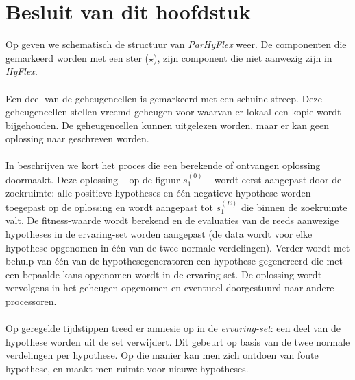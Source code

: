 \section{Besluit van dit hoofdstuk}

Op  geven we schematisch de structuur van \emph{ParHyFlex} weer.	De componenten die gemarkeerd worden met een ster ($\star$), zijn component die niet aanwezig zijn in \emph{HyFlex}.

\paragraph{}
Een deel van de geheugencellen is gemarkeerd met een schuine streep. Deze geheugencellen stellen vreemd geheugen voor waarvan er lokaal een kopie wordt bijgehouden. De geheugencellen kunnen uitgelezen worden, maar er kan geen oplossing naar geschreven worden.

\paragraph{}
In  beschrijven we kort het proces die een berekende of ontvangen oplossing doormaakt. Deze oplossing -- op de figuur $s_1^{(0)}$ -- wordt eerst aangepast door de zoekruimte: alle positieve hypotheses en \'e\'en negatieve hypothese worden toegepast op de oplossing en wordt aangepast tot $s_1^{(E)}$ die binnen de zoekruimte valt. De fitness-waarde wordt berekend en de evaluaties van de reeds aanwezige hypotheses in de ervaring-set worden aangepast (de data wordt voor elke hypothese opgenomen in \'e\'en van de twee normale verdelingen). Verder wordt met behulp van \'e\'en van de hypothesegeneratoren  een hypothese gegenereerd die met een bepaalde kans opgenomen wordt in de ervaring-set. De oplossing wordt vervolgens in het geheugen opgenomen en eventueel doorgestuurd naar andere processoren.

\paragraph{}
Op geregelde tijdstippen treed er amnesie op in de \emph{ervaring-set}: een deel van de hypothese worden uit de set verwijdert. Dit gebeurt op basis van de twee normale verdelingen per hypothese. Op die manier kan men zich ontdoen van foute hypothese, en maakt men ruimte voor nieuwe hypotheses.

